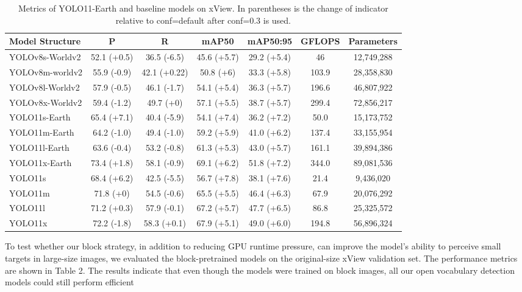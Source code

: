 \documentclass{article}
\begin{document}
\begin{table}[ht]
\centering
\caption{Metrics of YOLO11-Earth and baseline models on xView. In parentheses is the change of indicator relative to conf=default after conf=0.3 is used.}
\begin{tabular}{lcccccc}
\toprule
\textbf{Model Structure} & \textbf{P} & \textbf{R} & \textbf{mAP50} & \textbf{mAP50:95} & \textbf{GFLOPS} & \textbf{Parameters} \\
\midrule
YOLOv8s-Worldv2 & 52.1 (+0.5) & 36.5 (-6.5) & 45.6 (+5.7) & 29.2 (+5.4) & 46 & 12,749,288 \\
YOLOv8m-worldv2 & 55.9 (-0.9) & 42.1 (+0.22) & 50.8 (+6) & 33.3 (+5.8) & 103.9 & 28,358,830 \\
YOLOv8l-Worldv2 & 57.9 (-0.5) & 46.1 (-1.7) & 54.1 (+5.4) & 36.3 (+5.7) & 196.6 & 46,807,922 \\
YOLOv8x-Worldv2 & 59.4 (-1.2) & 49.7 (+0) & 57.1 (+5.5) & 38.7 (+5.7) & 299.4 & 72,856,217 \\
\midrule
YOLO11s-Earth & 65.4 (+7.1) & 40.4 (-5.9) & 54.1 (+7.4) & 36.2 (+7.2) & 50.0 & 15,173,752 \\
YOLO11m-Earth & 64.2 (-1.0) & 49.4 (-1.0) & 59.2 (+5.9) & 41.0 (+6.2) & 137.4 & 33,155,954 \\
YOLO11l-Earth & 63.6 (-0.4) & 53.2 (-0.8) & 61.3 (+5.3) & 43.0 (+5.7) & 161.1 & 39,894,386 \\
YOLO11x-Earth & 73.4 (+1.8) & 58.1 (-0.9) & 69.1 (+6.2) & 51.8 (+7.2) & 344.0 & 89,081,536 \\
\midrule
YOLO11s & 68.4 (+6.2) & 42.5 (-5.5) & 56.7 (+7.8) & 38.1 (+7.6) & 21.4 & 9,436,020 \\
YOLO11m & 71.8 (+0) & 54.5 (-0.6) & 65.5 (+5.5) & 46.4 (+6.3) & 67.9 & 20,076,292 \\
YOLO11l & 71.2 (+0.3) & 57.9 (-0.1) & 67.2 (+5.7) & 47.7 (+6.5) & 86.8 & 25,325,572 \\
YOLO11x & 72.2 (-1.8) & 58.3 (+0.1) & 67.9 (+5.1) & 49.0 (+6.0) & 194.8 & 56,896,324 \\
\bottomrule
\end{tabular}
\end{table}
To test whether our block strategy, in addition to reducing GPU runtime pressure, can improve the model's ability 
to perceive small targets in large-size images, we evaluated the block-pretrained models on the original-size 
xView validation set. The performance metrics are shown in Table 2. The results indicate that even though the 
models were trained on block images, all our open vocabulary detection models could still perform efficient 
\end{document}
